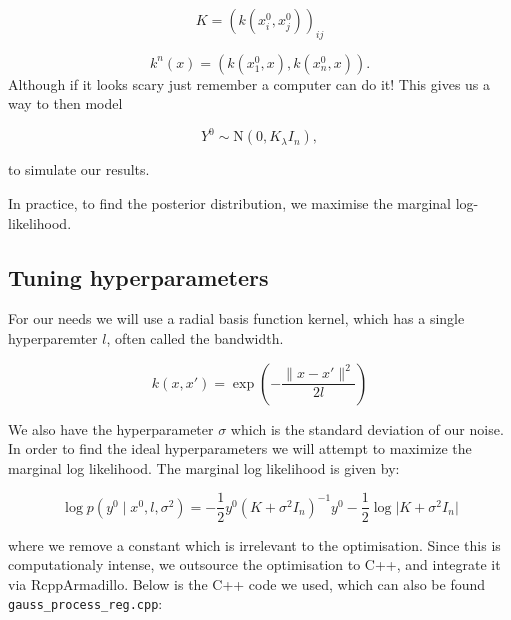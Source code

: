 \documentclass[
]{article}
\begin{document}
\[
K = (k(x_i^0,x_j^0))_{ij}
\]

\[
k^n(x) = (k(x_1^0,x),k(x_n^0,x)).
\] Although if it looks scary just remember a computer can do it! This
gives us a way to then model

\[Y^0 \sim \text{N}(0,K _ \lambda I_n),\]

to simulate our results.

In practice, to find the posterior distribution, we maximise the
marginal log-likelihood.

\hypertarget{tuning-hyperparameters}{%
\subsection{Tuning hyperparameters}\label{tuning-hyperparameters}}

For our needs we will use a radial basis function kernel, which has a
single hyperparemter \(l\), often called the bandwidth.

\[
k(x, x') = \exp\left(-\frac{\lVert x - x' \rVert^2}{2l}\right)
\]

We also have the hyperparameter \(\sigma\) which is the standard
deviation of our noise. In order to find the ideal hyperparameters we
will attempt to maximize the marginal log likelihood. The marginal log
likelihood is given by:

\[
\log p(y^0 \mid x^0, l,\sigma^2) = -\frac{1}{2} y^0 (K + \sigma^2 I_n)^{-1} y^0 - \frac{1}{2} \log \lvert K + \sigma^2 I_n \rvert 
\]

where we remove a constant which is irrelevant to the optimisation.
Since this is computationaly intense, we outsource the optimisation to
C++, and integrate it via RcppArmadillo. Below is the C++ code we used,
which can also be found \texttt{gauss\_process\_reg.cpp}:
\end{document}
